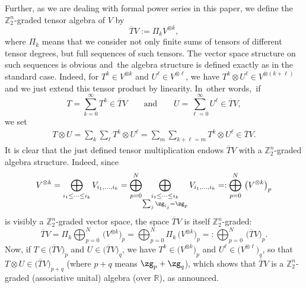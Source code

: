 \documentclass[10pt,a4paper]{amsart}
\newcommand{\R}{{\mathbb R}}
\newcommand{\Z}{{\mathbb Z}}
\newcommand{\0}{\otimes}
\numberwithin{equation}{section}
\begin{document}
Further, as we are dealing with formal power series in this paper, we define the $\Z_2^n$-graded tensor algebra of $V$ by
\[
\overline{T}V:=\Pi_k V^{\0 k},
\]
where $\Pi_k$ means that we consider not only finite sums of tensors of different tensor degrees, but full sequences of such tensors. The vector space structure on such sequences is obvious and~the algebra structure is defined exactly as in the standard case. Indeed, for $T^k\in V^{\0 k}$ and $U^\ell\in V^{\0 \ell}$, we have $T^k\0 U^\ell\in V^{\0(k+\ell)}$ and we just extend this tensor product by linearity. In~other words,~if
\[
T=\sum_{k=0}^\infty T^k\in\overline{T}V\qquad\text{and}\qquad U=\sum_{\ell=0}^{\infty}U^\ell\in\overline{T}V,
\]
we set
\begin{gather}\label{TenMult}
T\0 U=\sum_k\sum_\ell T^k\0 U^\ell=\sum_m\sum_{k+\ell=m}T^k\0 U^\ell\in \overline{T}V.
\end{gather}
It is clear that the just defined tensor multiplication endows $\overline{T}V$ with a $\Z_2^n$-graded algebra structure. Indeed, since
\[
V^{\0 k}=\bigoplus_{i_1\le\cdots\le i_k}V_{i_1,\dots, i_k}=\bigoplus_{p=0}^N\!\bigoplus_{
\substack{i_1\le\cdots\le i_k \\ \sum_j\zg_{i_j}=\zg_p}}V_{i_1,\dots, i_k}=:\bigoplus_{p=0}^N\,\big(V^{\0 k}\big)_p
\]
is visibly a $\Z_2^n$-graded vector space, the space $\overline{T}V$ is itself $\Z_2^n$-graded:
\[
\overline{T}V=\Pi_k\bigoplus_{p=0}^N\,\big(V^{\0 k}\big)_p=\bigoplus_{p=0}^N\Pi_k\,\big(V^{\0 k}\big)_p=:\bigoplus_{p=0}^N\,\big(\overline{T}V\big)_p.
\]
Now, if $T\in\big(\overline{T}V\big)_p$ and $U\in\big(\overline{T}V\big)_q$, we have $T^k\in\big(V^{\0 k}\big)_p$ and $U^\ell\in\big(V^{\0 \ell}\big)_q$, so that $T\0 U\in\big(\overline{T}V\big)_{p+q}$ (where $p+q$ means $\zg_p+\zg_q$), which shows that $\overline{T}V$ is a $\Z_2^n$-graded (associative unital) algebra (over $\R$), as announced.
\end{document}
